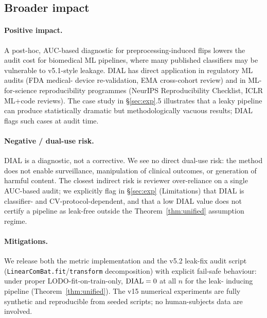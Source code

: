 %


\subsection{Broader impact}

\paragraph{Positive impact.}
A post-hoc, AUC-based diagnostic for preprocessing-induced flips
lowers the audit cost for biomedical ML pipelines, where many
published classifiers may be vulnerable to v5.1-style leakage.
DIAL has direct application in regulatory ML audits (FDA medical-
device re-validation, EMA cross-cohort review) and in ML-for-science
reproducibility programmes (NeurIPS Reproducibility Checklist, ICLR
ML+code reviews). The case study in \S\ref{sec:exp}.5 illustrates
that a leaky pipeline can produce statistically dramatic but
methodologically vacuous results; DIAL flags such cases at audit
time.

\paragraph{Negative / dual-use risk.}
DIAL is a diagnostic, not a corrective. We see no direct dual-use
risk: the method does not enable surveillance, manipulation of
clinical outcomes, or generation of harmful content. The closest
indirect risk is reviewer over-reliance on a single AUC-based
audit; we explicitly flag in \S\ref{sec:exp} (Limitations) that
DIAL is classifier- and CV-protocol-dependent, and that a low
DIAL value does not certify a pipeline as leak-free outside the
Theorem~\ref{thm:unified} assumption regime.

\paragraph{Mitigations.}
We release both the metric implementation and the v5.2 leak-fix
audit script (\texttt{LinearComBat.fit}/\texttt{transform}
decomposition) with explicit fail-safe behaviour: under proper
LODO-fit-on-train-only, $\mathrm{DIAL} = 0$ at all $n$ for the leak-
inducing pipeline (Theorem~\ref{thm:unified}). The v15 numerical
experiments are fully synthetic and reproducible from seeded
scripts; no human-subjects data are involved.

